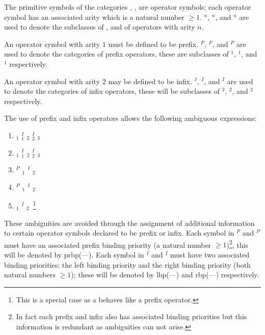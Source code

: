 The primitive symbols of the categories  {\funsym},
\predsym, {\sentconn} are operator symbols; each operator
symbol has an associated arity which is a natural number $\geq 1$.
\funsym$^n$, \predsym$^n$, and \sentconn$^n$ are used to denote the
subclasses of {\funsym}, {\predsym} and {\sentconn} of operators with
arity $n$.

An operator symbol with arity $1$ must be defined to be prefix. \funsym$^P$,
\predsym$^P$, and \sentconn$^P$ are used to denote the categories of prefix
operators, these are subclasses of \funsym$^1$, \predsym$^1$, and
\sentconn$^1$ respectively.

An operator symbol with arity $2$ may be defined to be infix. \funsym$^I$,
\predsym$^I$, and \sentconn$^I$  are used to denote the categories of infix
operators, these will be
subclasses of \funsym$^2$, \predsym$^2$, and \sentconn$^2$ respectively.

The use of prefix and infix operators allows the following ambiguous
expressions:


\begin{enumerate}

\item {\term}$_1$ {\funsym}$^I_1$ {\term}$_2$ {\funsym}$^I_2$ {\term}$_3$

\item {\wff}$_1$ {\sentconn}$^I_1$ {\wff}$_2$ {\sentconn}$^I_2$ {\wff}$_3$

\item {\funsym}$^P$ {\term}$_1$ {\funsym}$^I$ {\term}$_2$

\item {\sentconn}$^P$ {\wff}$_1$ {\sentconn}$^I$ {\wff}$_2$

\item {\quantprefix} {\wff}$_1$ {\sentconn}$^I$ {\wff}$_2$~\footnote{This is
a special case as a {\quantprefix} behaves like a prefix operator.}

\end{enumerate}

These ambiguities are avoided through the assignment of additional
information to certain operator symbols declared to be prefix or infix.
Each symbol in \funsym$^P$ and \sentconn$^P$ must
have an associated prefix binding priority (a natural number
$\geq 1$)\footnote{In fact each prefix and infix {\predsym} also has
associated binding priorities but this information is redundant as
ambiguities can not arise.}, this
will be denoted by prbp(---). Each symbol in \funsym$^I$ and \sentconn$^I$
must have two associated binding priorities: the left binding
priority and the right binding priority (both natural numbers $\geq 1$);
these will be denoted by lbp(---) and rbp(---) respectively.

